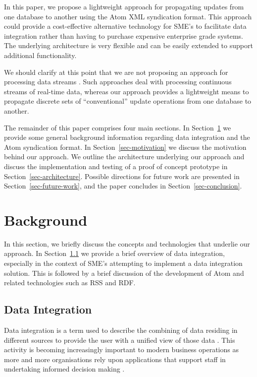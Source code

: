 \documentclass{CRPITStyle}
\begin{document}
In this paper, we propose a lightweight approach for propagating updates
from one database to another using the Atom XML syndication format. This
approach could provide a cost-effective alternative technology for SME's
to facilitate data integration rather than having to purchase expensive
enterprise grade systems. The underlying architecture is very flexible
and can be easily extended to support additional functionality.

We should clarify at this point that we are not proposing an approach
for processing data streams \cite{Babc-B-2002-Streams}. Such approaches
deal with processing continuous streams of real-time data, whereas our
approach provides a lightweight means to propagate discrete sets of
``conventional'' update operations from one database to another.

The remainder of this paper comprises four main sections. In
Section~\ref{sec-background} we provide some general background
information regarding data integration and the Atom syndication format.
In Section~\ref{sec-motivation} we discuss the motivation behind our
approach. We outline the architecture underlying our approach and
discuss the implementation and testing of a proof of concept prototype
in Section~\ref{sec-architecture}. Possible directions for future work
are presented in Section~\ref{sec-future-work}, and the paper concludes
in Section~\ref{sec-conclusion}.


\section{Background}
\label{sec-background}

In this section, we briefly discuss the concepts and technologies that
underlie our approach. In Section~\ref{sec-data-integration} we provide
a brief overview of data integration, especially in the context of SME's
attempting to implement a data integration solution. This is followed by
a brief discussion of the development of Atom and related technologies
such as RSS and RDF.


\subsection{Data Integration}
\label{sec-data-integration}

Data integration is a term used to describe the combining of data
residing in different sources to provide the user with a unified view of
those data \cite{Bati-C-1986,Yu-C-2004-SIGMOD}. This activity is
becoming increasingly important to modern business operations as more
and more organisations rely upon applications that support staff in
undertaking informed decision making
\cite{Calv-D-1998-CoopIS,Yu-C-2004-SIGMOD}.
\end{document}
